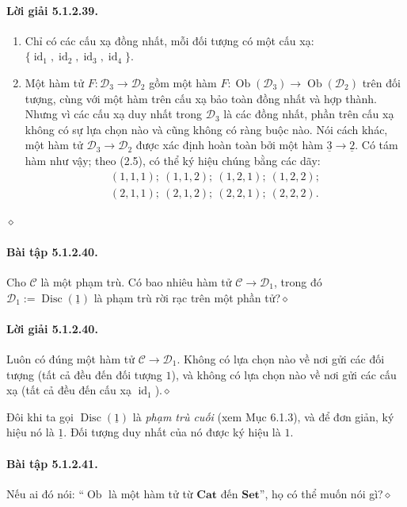 \paragraph{Lời giải 5.1.2.39.}
\begin{enumerate}[label=\alph*.]
\item Chỉ có các cấu xạ đồng nhất, mỗi đối tượng có một cấu xạ: $\{\operatorname{id}_1,\operatorname{id}_2,\operatorname{id}_3,\operatorname{id}_4\}$.
\item Một hàm tử $F:\mathcal D_3\to\mathcal D_2$ gồm một hàm $F:\operatorname{Ob}(\mathcal D_3)\to\operatorname{Ob}(\mathcal D_2)$ trên đối tượng, cùng với một hàm trên cấu xạ bảo toàn đồng nhất và hợp thành. Nhưng vì các cấu xạ duy nhất trong $\mathcal D_3$ là các đồng nhất, phần trên cấu xạ không có sự lựa chọn nào và cũng không có ràng buộc nào. Nói cách khác, một hàm tử $\mathcal D_3\to\mathcal D_2$ được xác định hoàn toàn bởi một hàm $\underline{3}\to\underline{2}$. Có tám hàm như vậy; theo (2.5), có thể ký hiệu chúng bằng các dãy:
\[\begin{gathered}(1,1,1);\ (1,1,2);\ (1,2,1);\ (1,2,2);\\(2,1,1);\ (2,1,2);\ (2,2,1);\ (2,2,2).\end{gathered}\]
\end{enumerate}\hfill$\diamond$
\paragraph{Bài tập 5.1.2.40.} Cho $\mathcal C$ là một phạm trù. Có bao nhiêu hàm tử $\mathcal C\to\mathcal D_1$, trong đó $\mathcal D_1:=\operatorname{Disc}(\underline{1})$ là phạm trù rời rạc trên một phần tử?\hfill$\diamond$
\paragraph{Lời giải 5.1.2.40.} Luôn có đúng một hàm tử $\mathcal C\to\mathcal D_1$. Không có lựa chọn nào về nơi gửi các đối tượng (tất cả đều đến đối tượng $1$), và không có lựa chọn nào về nơi gửi các cấu xạ (tất cả đều đến cấu xạ $\operatorname{id}_1$).\hfill$\diamond$

Đôi khi ta gọi $\operatorname{Disc}(\underline{1})$ là \emph{phạm trù cuối} (xem Mục 6.1.3), và để đơn giản, ký hiệu nó là $\underline{1}$. Đối tượng duy nhất của nó được ký hiệu là $1$.
\paragraph{Bài tập 5.1.2.41.} Nếu ai đó nói: ``$\operatorname{Ob}$ là một hàm tử từ $\mathbf{Cat}$ đến $\mathbf{Set}$'', họ có thể muốn nói gì?\hfill$\diamond$
